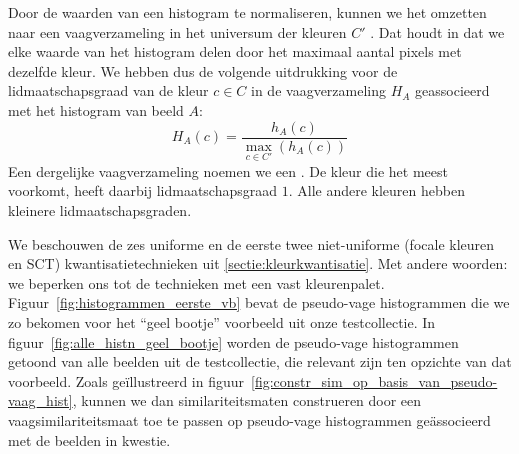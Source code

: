 Door de waarden van een histogram te normaliseren, kunnen we het omzetten naar 
een vaagverzameling in het universum der kleuren $C'$ 
\cite{debaets:similariteitsmaten_voor_kleurbeelden, vanderweken:similariteitsmaten, vertan:embedding_fuzzy_logic_in_cbir}. 
Dat houdt in dat we elke 
waarde van het histogram delen door het maximaal aantal pixels met dezelfde 
kleur. We hebben dus de volgende uitdrukking voor de lidmaatschapsgraad van de 
kleur $c \in C$ in de vaagverzameling $H_A$ geassocieerd met het histogram 
van beeld $A$: 
\begin{displaymath}
H_A(c) = \frac{\displaystyle h_A(c)}{\displaystyle \max_{c \in C'}(h_A(c))}
\end{displaymath}
Een dergelijke vaagverzameling noemen we een . 
De kleur die het meest voorkomt, heeft daarbij lidmaatschapsgraad $1$. Alle 
andere kleuren hebben kleinere lidmaatschapsgraden. 

We beschouwen de zes uniforme en de eerste twee niet-uniforme (focale kleuren en SCT) 
kwantisatietechnieken uit \ref{sectie:kleurkwantisatie}. 
Met andere woorden: we beperken ons tot de technieken met een vast kleurenpalet.
Figuur~\ref{fig:histogrammen_eerste_vb} bevat
de pseudo-vage histogrammen die we zo bekomen voor het ``geel bootje'' voorbeeld
uit onze testcollectie. In figuur~\ref{fig:alle_histn_geel_bootje} worden de pseudo-vage histogrammen
getoond van alle beelden uit de testcollectie, die relevant zijn ten opzichte van dat voorbeeld.
Zoals ge\"illustreerd in figuur~\ref{fig:constr_sim_op_basis_van_pseudo-vaag_hist}, kunnen we 
dan similariteitsmaten construeren door een vaagsimilariteitsmaat toe te passen op 
pseudo-vage histogrammen ge\"associeerd met de beelden in kwestie.

